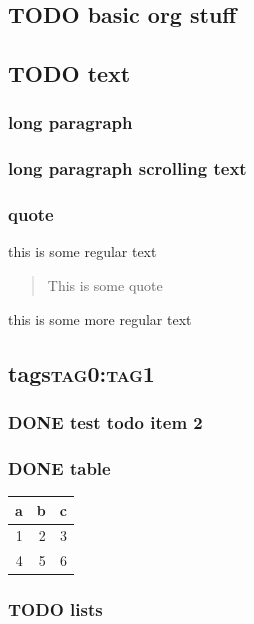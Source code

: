 \documentclass[11pt]{article}
\begin{document}
\subsection{{\bfseries\sffamily TODO} basic org stuff}
\label{sec:org15e0a99}
\subsection{{\bfseries\sffamily TODO} text}
\label{sec:org2190731}
\subsubsection{long paragraph}
\label{sec:org2ae3340}

\subsubsection{long paragraph scrolling text}
\label{sec:org446a773}

\subsubsection{quote}
\label{sec:orgdfc20b4}
this is some regular text
\begin{quote}
This is some quote
\end{quote}

this is some more regular text
\subsection{tags\hfill{}\textsc{tag0:tag1}}
\label{sec:org37ce046}
\subsubsection{{\bfseries\sffamily DONE} test todo item 2}
\label{sec:orgdc78db7}
\subsubsection{{\bfseries\sffamily DONE} table}
\label{sec:org82d6613}
\begin{table}[htbp]
\label{tab:org114faaf}
\centering
\begin{tabular}{rrr}
a & b & c\\
\hline
1 & 2 & 3\\
4 & 5 & 6\\
\end{tabular}
\end{table}
\subsubsection{{\bfseries\sffamily TODO} lists}
\label{sec:org93ad3dd}
\end{document}
